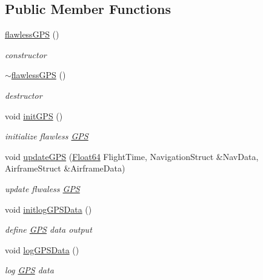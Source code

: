 \subsection*{Public Member Functions}
\begin{DoxyCompactItemize}
\item 
\hyperlink{classflawless_g_p_s_acf4fb3d275b9856b439f4f422184b740}{flawless\+G\+PS} ()
\begin{DoxyCompactList}\small\item\em constructor \end{DoxyCompactList}\item 
\hyperlink{classflawless_g_p_s_a359e5a055ac23edc077ffbe5fdb171bf}{$\sim$flawless\+G\+PS} ()
\begin{DoxyCompactList}\small\item\em destructor \end{DoxyCompactList}\item 
void \hyperlink{classflawless_g_p_s_a50cdffc0dc65e644f6191bc7c723521b}{init\+G\+PS} ()
\begin{DoxyCompactList}\small\item\em initialize flawless \hyperlink{class_g_p_s}{G\+PS} \end{DoxyCompactList}\item 
void \hyperlink{classflawless_g_p_s_aa93a0161307e087120572c717dd42a70}{update\+G\+PS} (\hyperlink{group___tools_ga3f1431cb9f76da10f59246d1d743dc2c}{Float64} Flight\+Time, Navigation\+Struct \&Nav\+Data, Airframe\+Struct \&Airframe\+Data)
\begin{DoxyCompactList}\small\item\em update flwaless \hyperlink{class_g_p_s}{G\+PS} \end{DoxyCompactList}\item 
void \hyperlink{classflawless_g_p_s_a6c6e03f68b5c7e8f984419a6d9adbe35}{initlog\+G\+P\+S\+Data} ()
\begin{DoxyCompactList}\small\item\em define \hyperlink{class_g_p_s}{G\+PS} data output \end{DoxyCompactList}\item 
void \hyperlink{classflawless_g_p_s_a764a28d4434bd497b3701dbff915291f}{log\+G\+P\+S\+Data} ()
\begin{DoxyCompactList}\small\item\em log \hyperlink{class_g_p_s}{G\+PS} data \end{DoxyCompactList}\end{DoxyCompactItemize}


